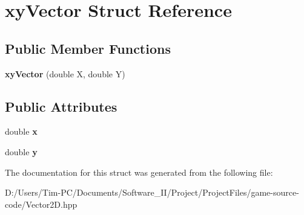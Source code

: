\hypertarget{structxy_vector}{}\section{xy\+Vector Struct Reference}
\label{structxy_vector}
\subsection*{Public Member Functions}
\begin{DoxyCompactItemize}
\item 
\mbox{\label{structxy_vector_a06d9403f8df005a7ea3b7765973a93fe}} 
{\bfseries xy\+Vector} (double X, double Y)
\end{DoxyCompactItemize}
\subsection*{Public Attributes}
\begin{DoxyCompactItemize}
\item 
\mbox{\label{structxy_vector_a104b718a786e5743e9ab2c76a7b30bbf}} 
double {\bfseries x}
\item 
\mbox{\label{structxy_vector_a9ca5953fcf4a614693e0e56ef5f52ee4}} 
double {\bfseries y}
\end{DoxyCompactItemize}


The documentation for this struct was generated from the following file\+:\begin{DoxyCompactItemize}
\item 
D\+:/\+Users/\+Tim-\/\+P\+C/\+Documents/\+Software\+\_\+\+I\+I/\+Project/\+Project\+Files/game-\/source-\/code/Vector2\+D.\+hpp\end{DoxyCompactItemize}
